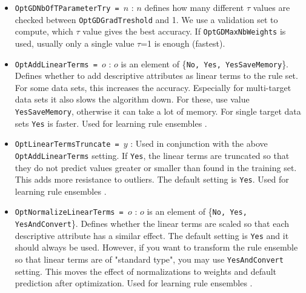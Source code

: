 \documentclass[a4paper]{report}
\begin{document}
\begin{itemize}
	\item \texttt{OptGDNbOfTParameterTry = $n$} : $n$ defines how many different $\tau$ values are checked between \texttt{Opt\-GD\-Grad\-Treshold} and 1. We use a validation set to compute, which $\tau$ value gives the best accuracy. If \texttt{OptGDMaxNbWeights} is used, usually only a single value $\tau$=1 is enough (fastest).
	\item \texttt{OptAddLinearTerms = $o$} : $o$ is an element of \{\texttt{No, Yes, YesSaveMemory}\}. Defines whether to add descriptive attributes as linear terms to the rule set. For some data sets, this increases the accuracy. Especially for multi-target data sets it also slows the algorithm down. For these, use value \texttt{YesSaveMemory}, otherwise it can take a lot of memory. For single target data sets \texttt{Yes} is faster. Used for learning rule ensembles \cite{Aho2009}.
	\item \texttt{OptLinearTermsTruncate = $y$} : Used in conjunction with the above \texttt{OptAddLinearTerms} setting. If \texttt{Yes}, the linear terms are truncated so that they do not predict values greater or smaller than found in the training set. This adds more resistance to outliers. The default setting is \texttt{Yes}. Used for learning rule ensembles \cite{Aho2009}.
	\item \texttt{OptNormalizeLinearTerms = $o$} : $o$ is an element of \{\texttt{No, Yes, YesAndConvert}\}. Defines whether the linear terms are scaled so that each descriptive attribute has a similar effect. The default setting is \texttt{Yes} and it should always be used. However, if you want to transform the rule ensemble so that linear terms are of "standard type", you may use \texttt{YesAndConvert} setting. This moves the effect of normalizations to weights and default prediction after optimization. Used for learning rule ensembles \cite{Aho2009}.
\end{itemize}
\end{document}
